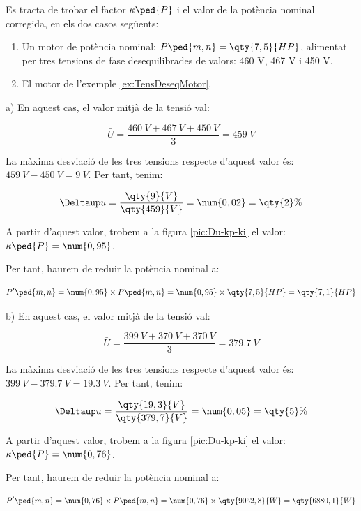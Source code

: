 \begin{exemple}[\MotorTensDeseqNEMA{}]
	\addcontentsxms{\MotorTensDeseqNEMA}
Es tracta de trobar el factor $\kappa\ped{P}$  i el valor de la potència nominal corregida, en els dos casos següents:	
    \begin{enumerate}
		\renewcommand{\labelenumi}{\alph{enumi})}
		\item Un motor de  potència nominal: $P\ped{m,n} = \qty{7,5}{HP}$, alimentat per tres tensions de fase desequilibrades   de valors: 460 V, 467 V i 450 V.
		
		\item El motor de l'exemple \vref{ex:TensDeseqMotor}.
	\end{enumerate}
	
	a)  En aquest cas, el valor mitjà de la tensió val:
	
    \[
      \bar{U} = \frac{\qty{460}{V}+\qty{467}{V}+\qty{450}{V}}{3} = \qty{459}{V}
    \]

    La màxima desviació de les tres tensions respecte d'aquest valor és: $\qty{459}{V}-\qty{450}{V} = \qty{9}{V}$. Per tant, tenim:
    
    \[
        \Deltaup u = \frac{\qty{9}{V}}{\qty{459}{V}} = \num{0,02} = \qty{2}{\%}
    \]

     A partir d'aquest valor, trobem a la figura \vref{pic:Du-kp-ki} el valor:  $\kappa\ped{P} = \num{0,95}$.

     Per tant, haurem de reduir la potència nominal a:
     
     \[
         P'\ped{m,n} = \num{0,95}\times{}P\ped{m,n}  = \num{0,95}\times\qty{7,5}{HP} = \qty{7,1}{HP}
     \]
     
	 b)  En aquest cas, el valor mitjà de la tensió val:
	 
	 \[
	 \bar{U} = \frac{\qty{399}{V}+\qty{370}{V}+\qty{370}{V}}{3} = \qty{379,7}{V}
	 \]
	 
	 La màxima desviació de les tres tensions respecte d'aquest valor és: $\qty{399}{V}-\qty{379,7}{V} = \qty{19,3}{V}$. Per tant, tenim:
	 
	 \[
	 \Deltaup u = \frac{\qty{19,3}{V}}{\qty{379,7}{V}} = \num{0,05} = \qty{5}{\%}
	 \]
	 
	 A partir d'aquest valor, trobem a la figura \ref{pic:Du-kp-ki} el valor:  $\kappa\ped{P} = \num{0,76}$.    
     
     Per tant, haurem de reduir la potència nominal a:
     
     \[
     P'\ped{m,n} = \num{0,76}\times{}P\ped{m,n}  = \num{0,76}\times\qty{9052,8}{W} = \qty{6880,1}{W}
     \]
\end{exemple}

